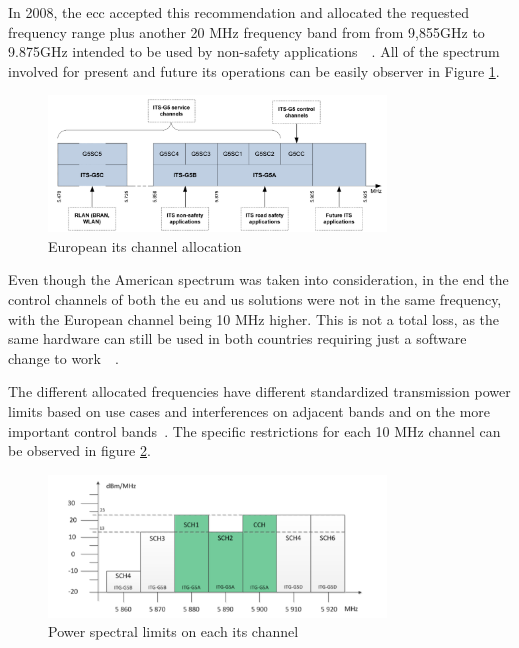 In 2008, the \gls{ecc} accepted this recommendation and allocated the requested frequency range plus another 20 MHz frequency band from from 9,855GHz to 9.875GHz intended to be used by non-safety applications~\cite{harri_multi-channel_2015}~\cite{asselin-miller_study_2016}. All of the spectrum involved for present and future \gls{its} operations can be easily observer in Figure \ref{fig:EU_channels}.

\begin{figure}[htbp]
    \centering
    \includegraphics[width=0.8\textwidth]{Chapters/Figures/VANETs/European_its_channels.png}
   	\caption{European \gls{its} channel allocation~\cite{soriga_its-g5_2012}}
   	\label{fig:EU_channels}
\end{figure}

Even though the American spectrum was taken into consideration, in the end the control channels of both the \gls{eu} and \gls{us} solutions were not in the same frequency, with the European channel being 10 MHz higher. This is not a total loss, as the same hardware can still be used in both countries requiring just a software change to work~\cite{harri_multi-channel_2015}~\cite{asselin-miller_study_2016}.

The different allocated frequencies have different standardized transmission power limits based on use cases and interferences on adjacent bands and on the more important control bands~\cite{festag_cooperative_2014}. The specific restrictions for each 10 MHz channel can be observed in figure \ref{fig:EU_channet_restriction}.

\begin{figure}[htbp]
    \centering
    \includegraphics[width=0.8\textwidth]{Chapters/Figures/VANETs/European_its_channels_restrictions.png}
   	\caption{Power spectral limits on each \gls{its} channel~\cite{harri_multi-channel_2015}}
   	\label{fig:EU_channet_restriction}
\end{figure}

